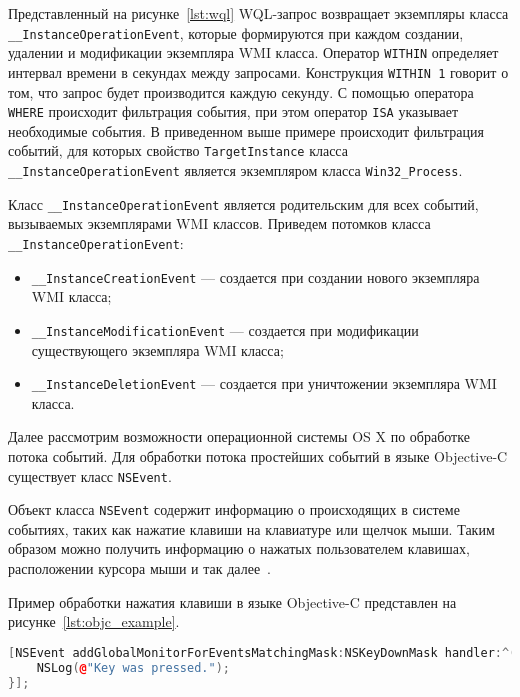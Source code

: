 Представленный на рисунке~\ref{lst:wql} WQL-запрос возвращает экземпляры класса
\texttt{\_\_InstanceOperationEvent}, которые формируются при каждом создании, удалении и
модификации экземпляра WMI класса. Оператор \texttt{WITHIN} определяет интервал времени
в секундах между запросами. Конструкция \texttt{WITHIN 1} говорит о том, что запрос будет
производится каждую секунду. С помощью оператора \texttt{WHERE} происходит фильтрация
события, при этом оператор \texttt{ISA} указывает необходимые события. В приведенном выше
примере происходит фильтрация событий, для которых свойство \texttt{TargetInstance} класса
\texttt{\_\_InstanceOperationEvent} является экземпляром класса \texttt{Win32\_Process}.

Класс \texttt{\_\_InstanceOperationEvent} является родительским для всех событий, вызываемых
экземплярами WMI классов. Приведем потомков класса \texttt{\_\_InstanceOperationEvent}:

\begin{itemize}
  \item \texttt{\_\_InstanceCreationEvent} --- создается при создании нового экземпляра
    WMI класса;
  \item \texttt{\_\_InstanceModificationEvent} --- создается при модификации существующего
    экземпляра WMI класса;
  \item \texttt{\_\_InstanceDeletionEvent} --- создается при уничтожении экземпляра WMI класса.
\end{itemize}

Далее рассмотрим возможности операционной системы OS X по обработке потока
событий. Для обработки потока простейших событий в языке Objective-C существует
класс \texttt{NSEvent}.

Объект класса \texttt{NSEvent} содержит информацию о происходящих в системе событиях,
таких как нажатие клавиши на клавиатуре или щелчок мыши. Таким образом можно
получить информацию о нажатых пользователем клавишах, расположении курсора мыши
и так далее~\cite{appledoc_nsevent}.

Пример обработки нажатия клавиши в языке Objective-C представлен
на рисунке~\ref{lst:objc_example}.
\begin{lstlisting}[basicstyle=\scriptsize\ttfamily,
                   numberstyle=\scriptsize\ttfamily,
                   xleftmargin=7mm,
                   language=C++,caption=Пример обработки нажатия клавиши в Objective-C,
                   label=lst:objc_example]
[NSEvent addGlobalMonitorForEventsMatchingMask:NSKeyDownMask handler:^(NSEvent *event) {
    NSLog(@"Key was pressed.");
}];
\end{lstlisting}

